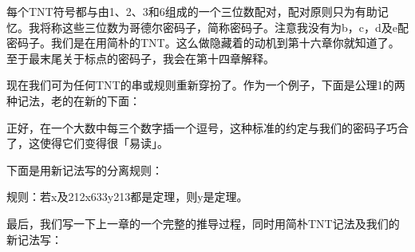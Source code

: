 \documentclass[
  12pt,
  twoside,
  openright,
  oldfontcommands,
]{memoir}
\begin{document}
每个TNT符号都与由1、2、3和6组成的一个三位数配对，配对原则只为有助记忆。我将称这些三位数为哥德尔密码子，简称密码子。注意我没有为b，c，d及e配密码子。我们是在用简朴的TNT。这么做隐藏着的动机到第十六章你就知道了。至于最末尾关于标点的密码子，我会在第十四章解释。

现在我们可为任何TNT的串或规则重新穿扮了。作为一个例子，下面是公理1的两种记法，老的在新的下面：


正好，在一个大数中每三个数字插一个逗号，这种标准的约定与我们的密码子巧合了，这使得它们变得很「易读」。

下面是用新记法写的分离规则：

规则：若x及212x633y213都是定理，则y是定理。

最后，我们写一下上一章的一个完整的推导过程，同时用简朴TNT记法及我们的新记法写：
\end{document}

